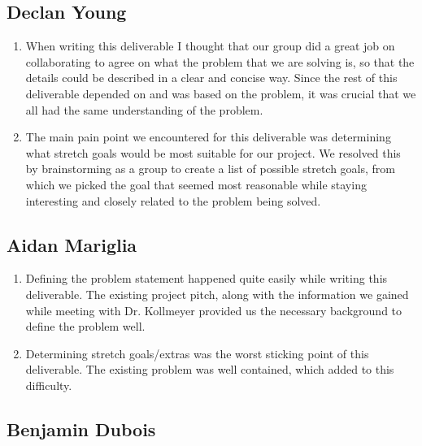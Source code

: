 \documentclass{article}
\begin{document}
\subsection*{Declan Young}

\begin{enumerate}
    \item When writing this deliverable I thought that our group did a great job on collaborating to agree on what the problem that we are solving is, so that the details could be described in a clear and concise way. Since the rest of this deliverable depended on and was based on the problem, it was crucial that we all had the same understanding of the problem.
    \item The main pain point we encountered for this deliverable was determining what stretch goals would be most suitable for our project. We resolved this by brainstorming as a group to create a list of possible stretch goals, from which we picked the goal that seemed most reasonable while staying interesting and closely related to the problem being solved.
\end{enumerate}  

\subsection*{Aidan Mariglia}

\begin{enumerate}
    \item Defining the problem statement happened quite easily while writing this deliverable. The existing project pitch, along with the information we gained while meeting with Dr. Kollmeyer provided us the necessary background to define the problem well.
    \item Determining stretch goals/extras was the worst sticking point of this deliverable. The existing problem was well contained, which added to this difficulty.
\end{enumerate}  

\subsection*{Benjamin Dubois}
\end{document}
